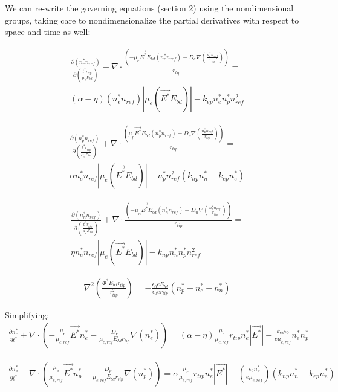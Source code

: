 \documentclass[12pt, a4paper]{report}
\begin{document}
\noindent
We can re-write the governing equations (section 2) using the nondimensional groups, taking care to nondimensionalize the partial derivatives with respect to space and time as well:

\begin{align*}
        \frac{\partial (n_e^* n_{ref})}{\partial \left(\frac{t^*r_{tip}}{\mu_e E_{bd}}  \right)} + \nabla \cdot\frac{\left( -\mu_e\vec{E^*}E_{bd}(n_e^*n_{ref}) - D_e\nabla \left(\frac{n_e^* n_{ref}}{r_{tip}}  \right) \right)}{r_{tip}} = \\ (\alpha - \eta) (n_e^*n_{ref})|\mu_e(\vec{E^*}E_{bd})| - k_{ep}n_e^*n_p^*n_{ref}^2
\end{align*}

\begin{align*}
    \frac{\partial (n_p^* n_{ref})}{\partial \left(\frac{t^*r_{tip}}{\mu_e E_{bd}}  \right)} + \nabla \cdot\frac{\left(\mu_p\vec{E^*}E_{bd}(n_p^*n_{ref}) - D_p\nabla \left(\frac{n_p^* n_{ref}}{r_{tip}}  \right) \right)}{r_{tip}} = \\ \alpha n_e^*n_{ref} |\mu_e(\vec{E^*}E_{bd})| - n_p^*n_{ref}^2\left(k_{np}n_n^* + k_{ep}n_e^*\right)
\end{align*}

\begin{align*}
    \frac{\partial (n_n^* n_{ref})}{\partial \left(\frac{t^*r_{tip}}{\mu_e E_{bd}}  \right)} + \nabla \cdot\frac{\left(-\mu_n\vec{E^*}E_{bd}(n_n^*n_{ref}) - D_n\nabla \left(\frac{n_n^* n_{ref}}{r_{tip}}  \right) \right)}{r_{tip}} = \\ \eta n_e^*n_{ref}|\mu_e(\vec{E^*}E_{bd})| - k_{np}n_n^*n_p^*n_{ref}^2
\end{align*}

\begin{align*}
    \nabla^2 \left(\frac{\Phi^*E_{bd}r_{tip}}{r_{tip}^2}\right) = -\frac{\epsilon_0 e E_{bd}}{\epsilon_0 e r_{tip}} (n_p^*-n_e^*-n_n^*)
\end{align*}

\noindent
Simplifying:
\begin{align*}
        \frac{\partial n_e^* }{\partial t^*} + \nabla \cdot \left(- \frac{\mu_e}{\mu_{e,ref}} \vec{E^*}n_e^* - \frac{{D_e}}{\mu_{e,ref} E_{bd}r_{tip}}\nabla (n_e^*)\right) = (\alpha - \eta)\frac{\mu_e}{\mu_{e,ref}}r_{tip} n_e^*|\vec{E^*}| - \frac{k_{ep} \epsilon_0}{e \mu_{e,ref}} n_e^*n_p^*
\end{align*}

\begin{align*}
        \frac{\partial n_p^* }{\partial t^*} + \nabla \cdot \left(\frac{\mu_p}{\mu_{e,ref}} \vec{E^*}n_p^* - \frac{{D_p}}{\mu_{e,ref} E_{bd}r_{tip}}\nabla (n_p^*)\right) = \alpha \frac{\mu_e}{\mu_{e,ref}}r_{tip} n_e^*|\vec{E^*}| - \left(\frac{\epsilon_0 n_p^*}{e \mu_{e,ref}} \right) \left(k_{np}n_n^* + k_{ep}n_e^*\right)
\end{align*}
\end{document}
